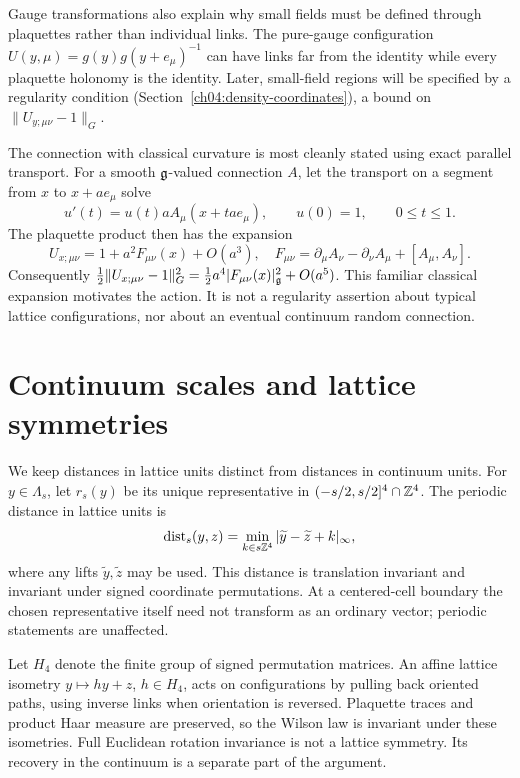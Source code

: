 Gauge transformations also explain why small fields must be defined
through plaquettes rather than individual links. The pure-gauge
configuration $U(y,\mu)=g(y)g(y+e_\mu)^{-1}$ can have links far from the
identity while every plaquette holonomy is the identity. Later,
small-field regions will be specified by a regularity condition (Section~\ref{ch04:density-coordinates}), a bound on $\|U_{y;\mu\nu}-1\|_G$.

The connection with classical curvature is most cleanly stated using exact
parallel transport. For a smooth $\mathfrak g$-valued connection $A$, let the
transport on a segment from $x$ to $x+ae_\mu$ solve
\[
 u'(t)=u(t)aA_\mu(x+tae_\mu),\qquad u(0)=1,\qquad 0\le t\le1.
\]
The plaquette product then has the expansion
\begin{equation}
 U_{x;\mu\nu}=1+a^2F_{\mu\nu}(x)+O(a^3),
 \quad
 F_{\mu\nu}=\partial_\mu A_\nu-\partial_\nu A_\mu+[A_\mu,A_\nu].
 \label{ch01:classical-curvature}
\end{equation}
Consequently
$\tfrac12\|U_{x;\mu\nu}-1\|_G^2
=\tfrac12 a^4|F_{\mu\nu}(x)|_{\mathfrak g}^2+O(a^5)$.
This familiar classical expansion motivates the action. It is not a
regularity assertion about typical lattice configurations, nor about an
eventual continuum random connection.

\section{Continuum scales and lattice symmetries}
\label{ch01:scales-section}

We keep distances in lattice units distinct from distances in continuum units.
For $y\in\Lambda_s$, let $r_s(y)$ be its unique representative in
$(-s/2,s/2]^4\cap\mathbb Z^4$. The periodic distance in lattice units is
\[
 \operatorname{dist}_s(y,z)=
       \min_{k\in s\mathbb Z^4}|\widetilde y-\widetilde z+k|_\infty,
\]
where any lifts $\widetilde y,\widetilde z$ may be used. This distance is
translation invariant and invariant under signed coordinate permutations.
At a centered-cell boundary the chosen representative itself need not
transform as an ordinary vector; periodic statements are unaffected.

Let $H_4$ denote the finite group of signed permutation matrices. An affine
lattice isometry $y\mapsto hy+z$, $h\in H_4$, acts on configurations by
pulling back oriented paths, using inverse links when orientation is
reversed. Plaquette traces and product Haar measure are preserved, so the
Wilson law is invariant under these isometries. Full Euclidean rotation
invariance is not a lattice symmetry. Its recovery in the continuum is a
separate part of the argument.

